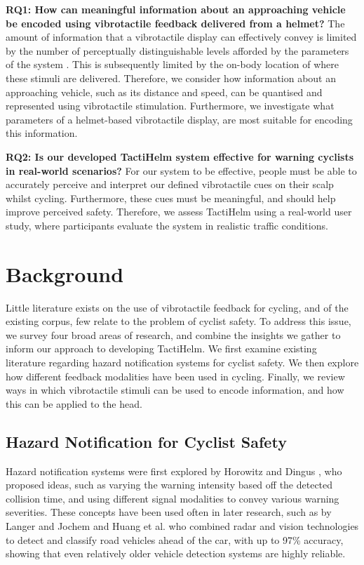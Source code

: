 \documentclass{mpaper}
\begin{document}
\textbf{RQ1: How can meaningful information about an approaching vehicle be encoded using vibrotactile feedback delivered from a helmet?} The amount of information that a vibrotactile display can effectively convey is limited by the number of perceptually distinguishable levels afforded by the parameters of the system \cite{guidelines}. This is subsequently limited by the on-body location of where these stimuli are delivered. Therefore, we consider how information about an approaching vehicle, such as its distance and speed, can be quantised and represented using vibrotactile stimulation. Furthermore, we investigate what parameters of a helmet-based vibrotactile display, are most suitable for encoding this information. \label{sec:rq1}

\textbf{RQ2: Is our developed TactiHelm system effective for warning cyclists in real-world scenarios?} For our system to be effective, people must be able to accurately perceive and interpret our defined vibrotactile cues on their scalp whilst cycling. Furthermore, these cues must be meaningful, and should help improve perceived safety. Therefore, we assess TactiHelm using a real-world user study, where participants evaluate the system in realistic traffic conditions. \label{sec:rq2}



\section{Background}
Little literature exists on the use of vibrotactile feedback for cycling, and of the existing corpus, few relate to the problem of cyclist safety. To address this issue, we survey four broad areas of research, and combine the insights we gather to inform our approach to developing TactiHelm. We first examine existing literature regarding hazard notification systems for cyclist safety. We then explore how different feedback modalities have been used in cycling. Finally, we review ways in which vibrotactile stimuli can be used to encode information, and how this can be applied to the head.

\subsection{Hazard Notification for Cyclist Safety}
Hazard notification systems were first explored by Horowitz and Dingus \cite{doi:10.1177/154193129203601320}, who proposed ideas, such as varying the warning intensity based off the detected collision time, and using different signal modalities to convey various warning severities. These concepts have been used often in later research, such as by Langer and Jochem \cite{566402} and Huang et al. \cite{1307429} who combined radar and vision technologies to detect and classify road vehicles ahead of the car, with up to 97\% accuracy, showing that even relatively older vehicle detection systems are highly reliable.
\end{document}
